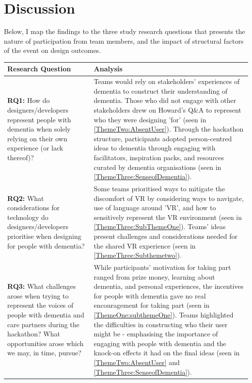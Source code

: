 \section{Discussion}
\label{sec:Discussion}
Below, I map the findings to the three study research questions that presents the nature of participation from team members, and the impact of structural factors of the event on design outcomes.


\begin{tabular}{  m{12em} | m{10cm} } 
 \textbf{Research Question} & \textbf{Analysis} \\ \hline
 \textbf{RQ1:} How do designers/developers represent people with dementia when solely relying on their own experience (or lack thereof)? & Teams would rely on stakeholders' experiences of dementia to construct their understanding of dementia. Those who did not engage with other stakeholders drew on Howard's Q\&A to represent who they were designing 'for' (seen in \ref{ThemeTwo:AbsentUser}). \newline \newline Through the hackathon structure, participants adopted person-centred ideas to dementia through engaging with facilitators, inspiration packs, and resources curated by dementia organisations (seen in \ref{ThemeThree:SenseofDementia}). 
 \\ 
  \hline
  \textbf{RQ2:} What considerations for technology do designers/developers prioritise when designing for people with dementia? & Some teams prioritised ways to mitigate the discomfort of VR by considering ways to navigate, use of language around 'VR', and how to sensitively represent the VR environment (seen in \ref{ThemeThree:SubThemeOne}). \newline \newline Teams' ideas present challenges and considerations needed for the shared VR experience (seen in \ref{ThemeThree:Subthemetwo}).\\ 
  \hline
  \textbf{RQ3:} What challenges arose when trying to represent the voices of people with dementia and care partners during the hackathon? What opportunities arose which we may, in time, pursue? & While participants' motivation for taking part ranged from prize money, learning about dementia, and personal experiences, the incentives for people with dementia gave no real encouragement for taking part (seen in \ref{ThemeOne:subthemeOne}). \newline \newline Teams highlighted the difficulties in constructing who their user might be - emphasising the importance of engaging with people with dementia and the knock-on effects it had on the final ideas (seen in \ref{ThemeTwo:AbsentUser} and \ref{ThemeThree:SenseofDementia}).  \\
  \hline
\end{tabular}


